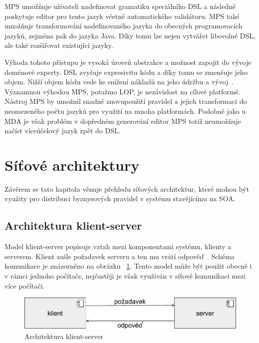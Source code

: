 MPS umožňuje uživateli nadefinovat gramatiku speciálního \gls{DSL} a následně poskytuje
editor pro tento jazyk včetně automatického validátoru. MPS také umožňuje transformování
nadefinovaného jazyka do obecných programovacích jazyků, zejména pak do jazyka Java.
Díky tomu lze nejen vytvářet libovolné \gls{DSL}, ale také rozšiřovat existující jazyky.

Výhoda tohoto přístupu je vysoká úroveň abstrakce a možnost zapojit do vývoje doménové experty.
\gls{DSL} zvyšuje expresivitu kódu a díky tomu se zmenšuje jeho objem.
Nižší objem kódu vede ke snížení nákladů na jeho údržbu a vývoj~\cite{littman1987mental}\cite{soloway1986empirical}.
Významnou výhodou MPS, potažmo \gls{LOP}, je nezávislost na cílové platformě.
Nástroj MPS by umožnil snadné znovupoužití pravidel a jejich transformaci do neomezeného počtu jazyků pro
využití na mnoha platformách. Podobně jako u \gls{MDA} je však problém v dopředném
generování \textendash\xspace editor MPS totiž neumožňuje načíst víceúčelový jazyk zpět do \gls{DSL}.

\section{Síťové architektury}

Závěrem se tato kapitola věnuje přehledu síťových architektur, které mohou být využity pro
distribuci byznysových pravidel v systému stavějícímu na \gls{SOA}.

\subsection{Architektura klient-server}\label{sec:client-server}

Model klient-server popisuje vztah mezi komponentami systému, klienty a serverem.
Klient zašle požadavek serveru a ten mu vrátí odpověď~\cite{berson1992client}.
Schéma komunikace je znázorněno na obrázku ~\ref{fig:client-server}.
Tento model může být použit obecně i v rámci jednoho počítače,
nejčastěji je však využíván v síťové komunikaci mezi více počítači.

\begin{figure}[t]
    \centering
    \includegraphics[keepaspectratio=true, width=0.6\linewidth]{figures/client-server.pdf}
    \caption{Architektura klient-server}
    \label{fig:client-server}
\end{figure}

